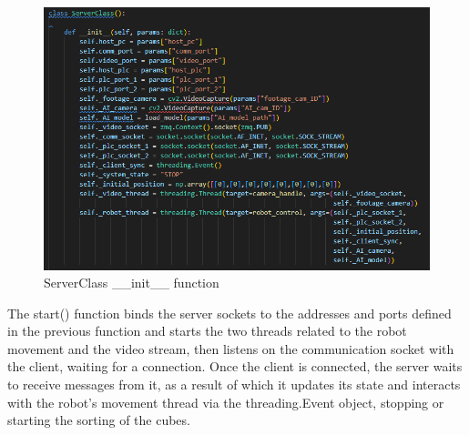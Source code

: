 \documentclass[a4paper,11pt]{report}
\theoremstyle{definition}
\theoremstyle{plain}
\begin{document}
        \begin{figure}[H]
        \includegraphics[scale=0.7]{images/Serverclass init.png}
        \centering
        \caption{ServerClass \_\_init\_\_ function}
        \end{figure}
        The start() function binds the server sockets to the addresses and ports defined in the previous function and starts the two threads related to the robot movement and the video stream, then listens on the communication socket with the client, waiting for a connection. Once the client is connected, the server waits to receive messages from it, as a result of which it updates its state and interacts with the robot's movement thread via the threading.Event object, stopping or starting the sorting of the cubes.
\end{document}
